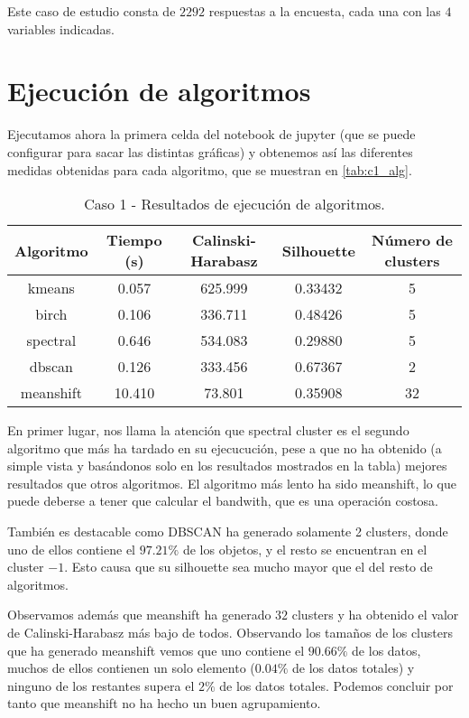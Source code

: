 Este caso de estudio consta de $2292$ respuestas a la encuesta, cada una con las $4$ variables indicadas.

\section{Ejecución de algoritmos}

Ejecutamos ahora la primera celda del notebook de jupyter (que se puede configurar para sacar las distintas gráficas) y obtenemos así las diferentes medidas obtenidas para cada algoritmo, que se muestran en \eqref{tab:c1_alg}.

\begin{table}[H]
\centering
\caption{Caso 1 - Resultados de ejecución de algoritmos.}
\label{tab:c1_alg}
\begin{tabular}{ccccc}
\toprule
 Algoritmo & Tiempo (s) & Calinski-Harabasz & Silhouette & Número de clusters \\
\midrule
kmeans & 0.057 & 625.999 & 0.33432 & 5 \\
birch & 0.106 & 336.711 & 0.48426 & 5 \\
spectral & 0.646 & 534.083 & 0.29880 & 5 \\
dbscan & 0.126 & 333.456 & 0.67367 & 2 \\
meanshift & 10.410 & 73.801 & 0.35908 & 32 \\
\bottomrule
\end{tabular}
\end{table}

En primer lugar, nos llama la atención que spectral cluster es el segundo algoritmo que más ha tardado en su ejecucución, pese a que no ha obtenido (a simple vista y basándonos solo en los resultados mostrados en la tabla) mejores resultados que otros algoritmos. El algoritmo más lento ha sido meanshift, lo que puede deberse a tener que calcular el bandwith, que es una operación costosa.

También es destacable como DBSCAN ha generado solamente 2 clusters, donde uno de ellos contiene el $97.21\%$ de los objetos, y el resto se encuentran en el cluster $-1$. Esto causa que su silhouette sea mucho mayor que el del resto de algoritmos.

Observamos además que meanshift ha generado $32$ clusters y ha obtenido el valor de Calinski-Harabasz más bajo de todos. Observando los tamaños de los clusters que ha generado meanshift vemos que uno contiene el $90.66\%$ de los datos, muchos de ellos contienen un solo elemento ($0.04\%$ de los datos totales) y ninguno de los restantes supera el $2\%$ de los datos totales. Podemos concluir por tanto que meanshift no ha hecho un buen agrupamiento.

